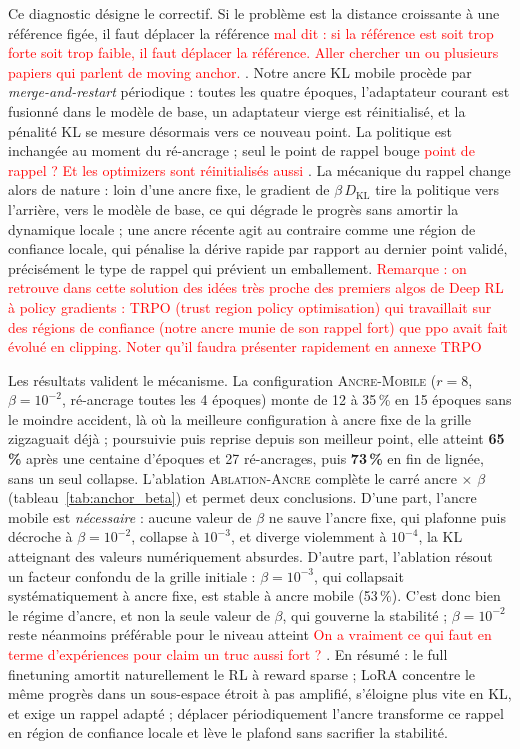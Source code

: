 \documentclass[11pt,a4paper]{article}
\begin{document}
Ce diagnostic désigne le correctif. Si le problème est la distance croissante à une référence figée, il faut déplacer la référence \textcolor{red}{mal dit : si la référence est soit trop forte soit trop faible, il faut déplacer la référence. Aller chercher un ou plusieurs papiers qui parlent de moving anchor.} . Notre ancre KL mobile procède par \emph{merge-and-restart} périodique : toutes les quatre époques, l'adaptateur courant est fusionné dans le modèle de base, un adaptateur vierge est réinitialisé, et la pénalité KL se mesure désormais vers ce nouveau point. La politique est inchangée au moment du ré-ancrage ; seul le point de rappel bouge \textcolor{red}{point de rappel ? Et les optimizers sont réinitialisés aussi} . La mécanique du rappel change alors de nature : loin d'une ancre fixe, le gradient de $\beta \, D_{\text{KL}}$ tire la politique vers l'arrière, vers le modèle de base, ce qui dégrade le progrès sans amortir la dynamique locale ; une ancre récente agit au contraire comme une région de confiance locale, qui pénalise la dérive rapide par rapport au dernier point validé, précisément le type de rappel qui prévient un emballement. \textcolor{red}{Remarque : on retrouve dans cette solution des idées très proche des premiers algos de Deep RL à policy gradients : TRPO (trust region policy optimisation) qui travaillait sur des régions de confiance (notre ancre munie de son rappel fort) que ppo avait fait évolué en clipping. Noter qu'il faudra présenter rapidement en annexe TRPO} 

Les résultats valident le mécanisme. La configuration \textsc{Ancre-Mobile} ($r=8$, $\beta = 10^{-2}$, ré-ancrage toutes les 4 époques) monte de 12 à 35\,\% en 15 époques sans le moindre accident, là où la meilleure configuration à ancre fixe de la grille zigzaguait déjà ; poursuivie puis reprise depuis son meilleur point, elle atteint \textbf{65\,\%} après une centaine d'époques et 27 ré-ancrages, puis \textbf{73\,\%} en fin de lignée, sans un seul collapse. L'ablation \textsc{Ablation-Ancre} complète le carré ancre $\times$ $\beta$ (tableau~\ref{tab:anchor_beta}) et permet deux conclusions. D'une part, l'ancre mobile est \emph{nécessaire} : aucune valeur de $\beta$ ne sauve l'ancre fixe, qui plafonne puis décroche à $\beta = 10^{-2}$, collapse à $10^{-3}$, et diverge violemment à $10^{-4}$, la KL atteignant des valeurs numériquement absurdes. D'autre part, l'ablation résout un facteur confondu de la grille initiale : $\beta = 10^{-3}$, qui collapsait systématiquement à ancre fixe, est stable à ancre mobile (53\,\%). C'est donc bien le régime d'ancre, et non la seule valeur de $\beta$, qui gouverne la stabilité ; $\beta = 10^{-2}$ reste néanmoins préférable pour le niveau atteint \textcolor{red}{On a vraiment ce qui faut en terme d'expériences pour claim un truc aussi fort ?} . En résumé : le full finetuning amortit naturellement le RL à reward sparse ; LoRA concentre le même progrès dans un sous-espace étroit à pas amplifié, s'éloigne plus vite en KL, et exige un rappel adapté ; déplacer périodiquement l'ancre transforme ce rappel en région de confiance locale et lève le plafond sans sacrifier la stabilité.
\end{document}
